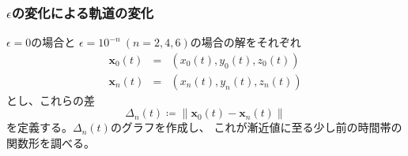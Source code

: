 \documentclass[a4j, titlepage]{jsarticle}
\numberwithin{equation}{section}
\begin{document}
        \subsubsection{$\epsilon$の変化による軌道の変化}
            $\epsilon = 0$の場合と
            $\epsilon = 10^{-n} \ (n = 2, 4, 6)$の場合の解をそれぞれ
            \begin{eqnarray*}
                \bm{x}_0(t) &=& (x_0(t), y_0(t), z_0(t)) \\
                \bm{x}_n(t) &=& (x_n(t), y_n(t), z_n(t))
            \end{eqnarray*}
            とし、これらの差
            \begin{equation*}
                \Delta_n(t) \coloneqq \|\bm{x}_0(t) - \bm{x}_n(t)\|
            \end{equation*}
            を定義する。$\Delta_n(t)$のグラフを作成し、
            これが漸近値に至る少し前の時間帯の関数形を調べる。
\end{document}

